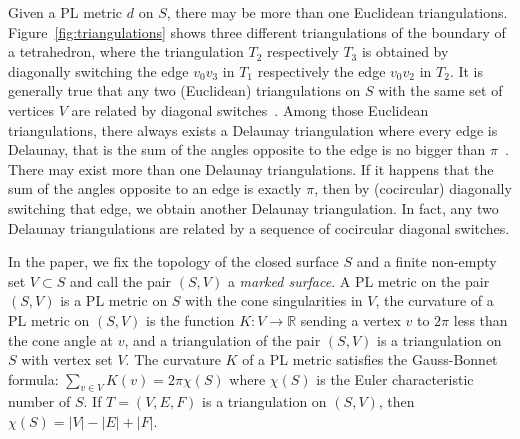 \documentclass[11pt]{article}
\begin{document}
Given a PL metric $d$ on $S$, there may be more than one Euclidean triangulations. 
Figure~\ref{fig:triangulations} shows three different triangulations of the boundary of a tetrahedron, 
where the triangulation $T_2$ respectively $T_3$ is obtained by diagonally switching the edge $v_0v_3$ in
$T_1$ respectively the edge $v_0v_2$ in $T_2$. It is generally true that any two (Euclidean) 
triangulations on $S$ with the same set of vertices $V$ are related by diagonal switches~\cite{Hatcher}. 
Among those Euclidean triangulations, there always exists a Delaunay triangulation where
every edge is Delaunay, that is the sum of the angles opposite to the edge is no bigger than $\pi$~\cite{Bobenko07}. 
There may exist more than one Delaunay triangulations.  If it happens that the sum of the angles 
opposite to an edge is exactly $\pi$, then by (cocircular) diagonally switching that edge, 
we obtain another Delaunay triangulation. In fact, any two Delaunay triangulations are related by 
a sequence of cocircular diagonal switches. 


In the paper, we fix the topology of the closed surface $S$ and a finite non-empty set $V\subset S$
and call the pair $(S, V)$ a {\it marked surface}. A PL metric on the pair $(S, V)$ is a PL metric
on $S$ with the cone singularities in $V$, the curvature of a PL metric on $(S, V)$ is the function 
$K: V\rightarrow \mathbb{R}$ sending a vertex $v$ to $2\pi$ less than the cone angle at $v$, and a 
triangulation of the pair $(S, V)$ is a triangulation on $S$ with vertex set $V$. The curvature $K$
of a PL metric satisfies the Gauss-Bonnet formula: $\sum_{v\in V}K(v) = 2\pi\chi(S)$ where $\chi(S)$
is the Euler characteristic number of $S$. If $T = (V, E, F)$ is a triangulation on $(S, V)$, then 
$\chi(S) = |V| -|E| + |F|$. 
\end{document}
